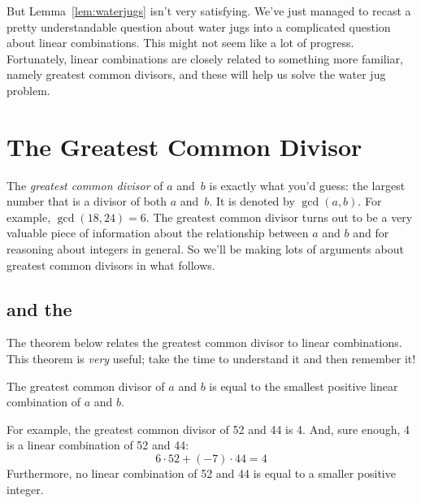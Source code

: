 But Lemma~\ref{lem:waterjugs} isn't very satisfying.  We've just
managed to recast a pretty understandable question about water jugs
into a complicated question about linear combinations.  This might not
seem like a lot of progress.  Fortunately, linear combinations are closely
related to something more familiar, namely greatest common divisors,
and these will help us solve the water jug problem.



\section{The Greatest Common Divisor}
\label{sec:gcd}

The \emph{greatest common divisor} of $a$ and~$b$ is exactly what
you'd guess: the largest number that is a divisor of both $a$ and~$b$.
It is denoted by $\gcd(a, b)$.  For example, $\gcd(18, 24) = 6$.  The
greatest common divisor turns out to be a very valuable piece of
information about the relationship between $a$ and $b$ and for
reasoning about integers in general.  So we'll be making lots of
arguments about greatest common divisors in what follows.

\subsection{ and the }

The theorem below relates the greatest common divisor to linear
combinations.  This theorem is \emph{very} useful; take the time to
understand it and then remember it!

\begin{theorem}
\label{th:gcd}
The greatest common divisor of $a$ and $b$ is equal to the smallest
positive linear combination of $a$ and $b$.
\end{theorem}

For example, the greatest common divisor of 52 and 44 is 4.  And, sure
enough, 4 is a linear combination of 52 and 44:
%
\[
6 \cdot 52 + (-7) \cdot 44  =  4
\]
%
Furthermore, no linear combination of 52 and 44 is equal to a smaller
positive integer.

